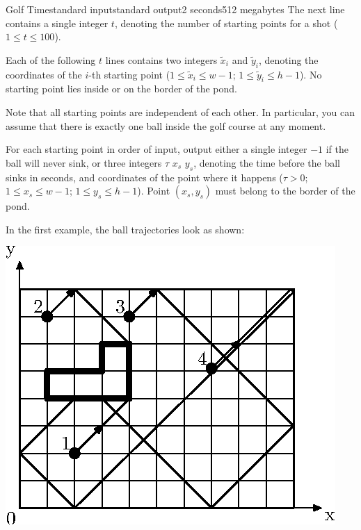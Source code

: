 \begin{problem}{Golf Time}{standard input}{standard output}{2 seconds}{512 megabytes}
The next line contains a single integer $t$, denoting the number of starting points for a shot ($1 \le t \le 100$).

Each of the following $t$ lines contains two integers $\tilde{x}_i$ and $\tilde{y}_i$, denoting the coordinates of the $i$-th starting point ($1 \le \tilde{x}_i \le w - 1$; $1 \le \tilde{y}_i \le h - 1$). No starting point lies inside or on the border of the pond.

Note that all starting points are independent of each other. In particular, you can assume that there is exactly one ball inside the golf course at any moment.


\OutputFile
For each starting point in order of input, output either a single integer $-1$ if the ball will never sink, or three integers $\tau$ $x_s$ $y_s$, denoting the time before the ball sinks in seconds, and coordinates of the point where it happens ($\tau > 0$; $1 \le x_s \le w - 1$; $1 \le y_s \le h - 1$). Point $(x_s, y_s)$ must belong to the border of the pond.

\Examples

\begin{example}
%
%
\end{example}

\Note
In the first example, the ball trajectories look as shown:

\begin{center}
\includegraphics{a-1}
\end{center}


\end{problem}
